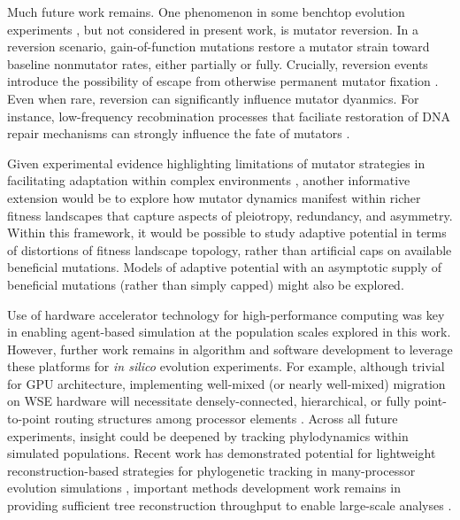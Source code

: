 Much future work remains.
One phenomenon in some benchtop evolution experiments \citep{ho2021evolutionary}, but not considered in present work, is mutator reversion.
In a reversion scenario, gain-of-function mutations restore a mutator strain toward baseline nonmutator rates, either partially or fully.
Crucially, reversion events introduce the possibility of escape from otherwise permanent mutator fixation \citep{taddei1997role}.
Even when rare, reversion can significantly influence mutator dyanmics.
For instance, low-frequency recobmination processes that faciliate restoration of DNA repair mechanisms can strongly influence the fate of mutators \citep{tenaillon2000mutators}.

Given experimental evidence highlighting limitations of mutator strategies in facilitating adaptation within complex environments \citep{ho2021evolutionary}, another informative extension would be to explore how mutator dynamics manifest within richer fitness landscapes that capture aspects of pleiotropy, redundancy, and asymmetry.
Within this framework, it would be possible to study adaptive potential in terms of distortions of fitness landscape topology, rather than artificial caps on available beneficial mutations.
Models of adaptive potential with an asymptotic supply of beneficial mutations (rather than simply capped) might also be explored.

Use of hardware accelerator technology for high-performance computing was key in enabling agent-based simulation at the population scales explored in this work.
However, further work remains in algorithm and software development to leverage these platforms for \textit{in silico} evolution experiments.
For example, although trivial for GPU architecture, implementing well-mixed (or nearly well-mixed) migration on WSE hardware will necessitate densely-connected, hierarchical, or fully point-to-point routing structures among processor elements \citep{james2020physical,luczynski2024near}.
Across all future experiments, insight could be deepened by tracking phylodynamics within simulated populations.
Recent work has demonstrated potential for lightweight reconstruction-based strategies for phylogenetic tracking in many-processor evolution simulations \citep{moreno2022hereditary}, important methods development work remains in providing sufficient tree reconstruction throughput to enable large-scale analyses \citep{moreno2024trackable}.

